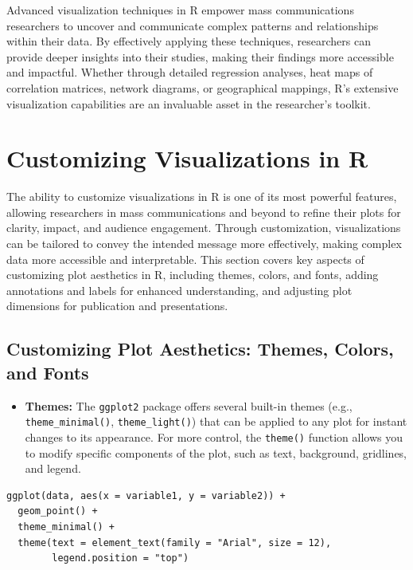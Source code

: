 \documentclass[
]{book}
\providecommand{\tightlist}{%
  \setlength{\itemsep}{0pt}\setlength{\parskip}{0pt}}
\begin{document}
Advanced visualization techniques in R empower mass communications researchers to uncover and communicate complex patterns and relationships within their data. By effectively applying these techniques, researchers can provide deeper insights into their studies, making their findings more accessible and impactful. Whether through detailed regression analyses, heat maps of correlation matrices, network diagrams, or geographical mappings, R's extensive visualization capabilities are an invaluable asset in the researcher's toolkit.

\hypertarget{customizing-visualizations-in-r}{%
\section{Customizing Visualizations in R}\label{customizing-visualizations-in-r}}

The ability to customize visualizations in R is one of its most powerful features, allowing researchers in mass communications and beyond to refine their plots for clarity, impact, and audience engagement. Through customization, visualizations can be tailored to convey the intended message more effectively, making complex data more accessible and interpretable. This section covers key aspects of customizing plot aesthetics in R, including themes, colors, and fonts, adding annotations and labels for enhanced understanding, and adjusting plot dimensions for publication and presentations.

\hypertarget{customizing-plot-aesthetics-themes-colors-and-fonts}{%
\subsection{Customizing Plot Aesthetics: Themes, Colors, and Fonts}\label{customizing-plot-aesthetics-themes-colors-and-fonts}}

\begin{itemize}
\tightlist
\item
  \textbf{Themes:} The \texttt{ggplot2} package offers several built-in themes (e.g., \texttt{theme\_minimal()}, \texttt{theme\_light()}) that can be applied to any plot for instant changes to its appearance. For more control, the \texttt{theme()} function allows you to modify specific components of the plot, such as text, background, gridlines, and legend.
\end{itemize}

\begin{verbatim}
ggplot(data, aes(x = variable1, y = variable2)) + 
  geom_point() +
  theme_minimal() +
  theme(text = element_text(family = "Arial", size = 12),
        legend.position = "top")
\end{verbatim}
\end{document}
